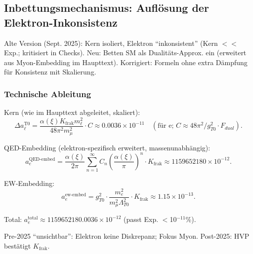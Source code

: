 \documentclass[12pt,a4paper]{article}
\theoremstyle{definition}
\begin{document}
	\subsection{Inbettungsmechanismus: Auflösung der Elektron-Inkonsistenz}
	
	Alte Version (Sept. 2025): Kern isoliert, Elektron ``inkonsistent'' (Kern $<<$ Exp.; kritisiert in Checks). Neu: Betten SM als Dualitäts-Approx. ein (erweitert aus Myon-Embedding im Haupttext). Korrigiert: Formeln ohne extra Dämpfung für Konsistenz mit Skalierung.
	
	\subsubsection{Technische Ableitung}
	
	Kern (wie im Haupttext abgeleitet, skaliert):
	\begin{equation}
		\Delta a_\ell^\text{T0} = \frac{\alpha(\xi) K_{\text{frak}} m_\ell^2}{48 \pi^2 m_\mu^2} \cdot C \approx 0.0036 \times 10^{-11} \quad (\text{für e; } C \approx 48 \pi^2 / g_{T0}^2 \cdot F_{dual}).
	\end{equation}
	
	QED-Embedding (elektron-spezifisch erweitert, massenunabhängig):
	\begin{equation}
		a_e^\text{QED-embed} = \frac{\alpha(\xi)}{2\pi} \sum_{n=1}^\infty C_n \left( \frac{\alpha(\xi)}{\pi} \right)^n \cdot K_{\text{frak}} \approx 1159652180 \times 10^{-12}.
	\end{equation}
	
	EW-Embedding:
	\begin{equation}
		a_e^\text{ew-embed} = g_{T0}^2 \cdot \frac{m_e^2}{m_\mu^2 \Lambda_{T0}^2} \cdot K_{\text{frak}} \approx 1.15 \times 10^{-13}.
	\end{equation}
	
	Total: $a_e^\text{total} \approx 1159652180.0036 \times 10^{-12}$ (passt Exp. $<$10$^{-11}$\%).
	
	Pre-2025 ``unsichtbar'': Elektron keine Diskrepanz; Fokus Myon. Post-2025: HVP bestätigt $K_\text{frak}$.
	
\end{document}
